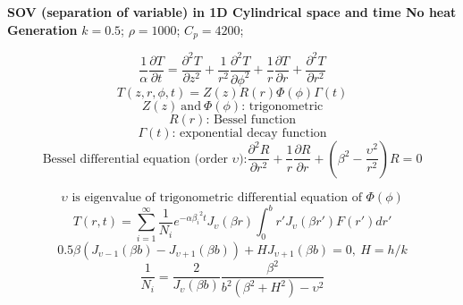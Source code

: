 \begin{example}
\textbf{SOV (separation of variable) in 1D Cylindrical space and time
No heat Generation}
$k = 0.5$; $\rho= 1000$; $C_p = 4200$;

$$\frac{1}{\alpha}\frac{\partial T}{\partial t}=
\frac{\partial^2 T}{\partial z^2}+
\frac{1}{r^2}\frac{\partial^2 T}{\partial \phi^2}+
\frac{1}{r}\frac{\partial T}{\partial r}+
\frac{\partial^2 T}{\partial r^2}$$
$$T(z,r,\phi,t)=Z(z)R(r)\Phi(\phi)\Gamma(t)$$
$$Z(z)~\text{and} ~\Phi(\phi)\text{: trigonometric}$$
$$R(r)\text{: Bessel function}$$
$$\Gamma(t)\text{: exponential decay function}$$
$$\text{Bessel differential equation (order } \upsilon\text{):}
\frac{\partial^2 R}{\partial r^2}+
\frac{1}{r}\frac{\partial R}{\partial r}+
\left(\beta^2-\frac{\upsilon^2}{r^2}\right) R=0
$$

$$\upsilon \text{ is eigenvalue of trigonometric differential equation of } \Phi(\phi)$$
$$T(r,t)=\sum_{i=1}^{\infty} \frac{1}{N_i}e^{-\alpha{\beta_i}^2t}J_\upsilon(\beta r)\int_0^{b}r'J_\upsilon(\beta r')F(r')dr'$$
$$0.5\beta(J_{\upsilon-1}(\beta b)-
J_{\upsilon+1}(\beta b))+
HJ_{\upsilon+1}(\beta b)=0,
~H=h/k
$$
$$\frac{1}{N_i}=\frac{2}{J_\upsilon(\beta b)}
\frac{\beta^2}{b^2(\beta^2+H^2)-\upsilon^2}
$$
\end{example}

